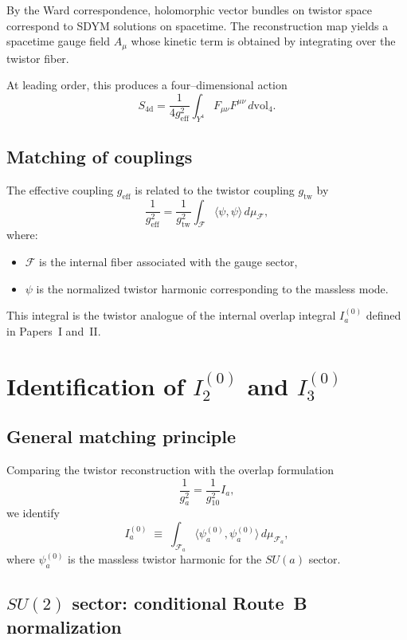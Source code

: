 \documentclass[11pt]{article}
\begin{document}
By the Ward correspondence, holomorphic vector bundles on twistor space
correspond to SDYM solutions on spacetime.
The reconstruction map yields a spacetime gauge field $A_\mu$ whose kinetic term
is obtained by integrating over the twistor fiber.

At leading order, this produces a four--dimensional action
\[
S_{\mathrm{4d}} = \frac{1}{4g_{\mathrm{eff}}^2}
\int_{Y^4} F_{\mu\nu}F^{\mu\nu}\,d\mathrm{vol}_4.
\]

\subsection{Matching of couplings}

The effective coupling $g_{\mathrm{eff}}$ is related to the twistor coupling
$g_{\mathrm{tw}}$ by
\[
\frac{1}{g_{\mathrm{eff}}^2}
=
\frac{1}{g_{\mathrm{tw}}^2}
\int_{\mathcal F} \langle \psi, \psi\rangle\,d\mu_{\mathcal F},
\]
where:
\begin{itemize}
\item $\mathcal F$ is the internal fiber associated with the gauge sector,
\item $\psi$ is the normalized twistor harmonic corresponding to the massless mode.
\end{itemize}

This integral is the twistor analogue of the internal overlap integral
$I_a^{(0)}$ defined in Papers~I and~II.

\section{Identification of $I_2^{(0)}$ and $I_3^{(0)}$}

\subsection{General matching principle}

Comparing the twistor reconstruction with the overlap formulation
\[
\frac{1}{g_a^2} = \frac{1}{g_{10}^2} I_a,
\]
we identify
\[
I_a^{(0)} \;\equiv\;
\int_{\mathcal F_a} \langle \psi_a^{(0)}, \psi_a^{(0)}\rangle\,d\mu_{\mathcal F_a},
\]
where $\psi_a^{(0)}$ is the massless twistor harmonic for the $SU(a)$ sector.

\subsection{$SU(2)$ sector: conditional Route~B normalization}
\end{document}
